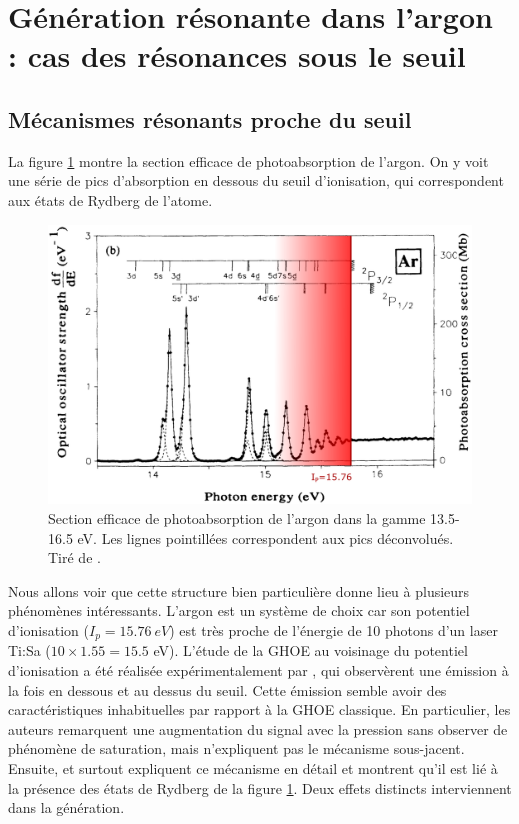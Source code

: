 \section{Génération résonante dans l'argon : cas des résonances sous le seuil}
\subsection{Mécanismes résonants proche du seuil}
La figure \ref{fig:ArIp} montre la section efficace de photoabsorption de l'argon. On y voit une série de pics d'absorption en dessous du seuil d'ionisation, qui correspondent aux états de Rydberg de l'atome.

\begin{figure}[!ht]
\centering
\includegraphics[width=0.9\columnwidth]{Figures/ResonantArgon/argon_spectrum.png}%
\caption{Section efficace de photoabsorption de l'argon dans la gamme 13.5-16.5 eV. Les lignes pointillées correspondent aux pics déconvolués. Tiré de .}
\label{fig:ArIp}%
\end{figure}

Nous allons voir que cette structure bien particulière donne lieu à plusieurs phénomènes intéressants. L'argon est un système de choix car son potentiel d'ionisation ($I_p = \SI{15.76}{eV}$) est très proche de l'énergie de 10 photons d'un laser Ti:Sa ($10\times 1.55 = 15.5$ eV). L'étude de la GHOE au voisinage du potentiel d'ionisation a été réalisée expérimentalement par , qui observèrent une émission à la fois en dessous et au dessus du seuil. Cette émission semble avoir des caractéristiques inhabituelles par rapport à la GHOE classique. En particulier, les auteurs remarquent une augmentation du signal avec la pression sans observer de phénomène de saturation, mais n'expliquent pas le mécanisme sous-jacent. Ensuite,  et surtout  expliquent ce mécanisme en détail et montrent qu'il est lié à la présence des états de Rydberg de la figure \ref{fig:ArIp}. Deux effets distincts interviennent dans la génération.

